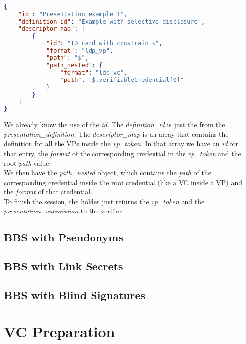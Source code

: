 \documentclass[
	a4paper               %
	,bibliography=totoc   %
	,listof=totoc         %
	,monolingual
]{bfhthesis}              %
\begin{document}
\begin{lstlisting}[language=json,firstnumber=1,caption={Example of a presentation submission},captionpos=b, label={list:pressub}]
{
	"id": "Presentation example 1",
	"definition_id": "Example with selective disclosure",
	"descriptor_map": [
		{
			"id": "ID card with constraints",
			"format": "ldp_vp",
			"path": "$",
			"path_nested": {
				"format": "ldp_vc",
				"path": "$.verifiableCredential[0]"
			}
		}
	]
}
\end{lstlisting}

We already know the use of the \textit{id}. The \textit{definition\_id} is just the  from the \textit{presentation\_definition}.
The \textit{descriptor\_map} is an array that contains the definition for all the VPs inside the \textit{vp\_token}.
In that array we have an \textit{id} for that entry, the \textit{format} of the corresponding credential in the \textit{vp\_token} and the root \textit{path} value.\\
We then have the \textit{path\_nested} object, which contains the \textit{path} of the corresponding credential inside the root credential (like a VC inside a VP) and the   \textit{format} of that credential.\\

To finish the session, the holder just returns the \textit{vp\_token} and the \textit{presentation\_submission} to the verifier.


\section{BBS with Pseudonyms}
\label{chap:Pseudonyms}

\section{BBS with Link Secrets}
\label{chap:linksecrets}

\section{BBS with Blind Signatures}
\label{chap:blindsignatures}




\appendix


\chapter{VC Preparation}
\label{chap:vctobbs}
\end{document}
